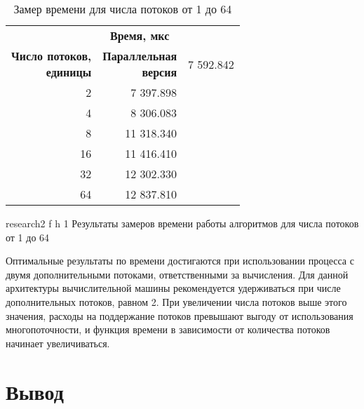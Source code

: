 \begin{table}[ht]
	\small
	\begin{center}
		\begin{threeparttable}
			\caption{Замер времени для числа потоков от 1 до 64}
			\label{tbl:time2}
			\begin{tabular}{|r|r|r|}
				\hline
				& \multicolumn{1}{c|}{\bfseries Время, мкс} \\ \cline{2-2}
				\bfseries \makecell{Число потоков, \\ единицы} & \bfseries \makecell{Параллельная \\ версия} \cline{2-2}
				\hline
				1 & 7 592.842 \\
				\hline
				2 & 7 397.898 \\
				\hline
				4 & 8 306.083  \\
				\hline
				8 & 11 318.340 \\
				\hline
				16 & 11 416.410 \\
				\hline
				32 & 12 302.330 \\
				\hline
				64 & 12 837.810 \\
				\hline
			\end{tabular}	
		\end{threeparttable}
	\end{center}
\end{table}

\clearpage

{research2} %
{f} %
{h} %
{1\textwidth} %
{Результаты замеров времени работы алгоритмов для числа потоков от 1 до 64} %

Оптимальные результаты по времени достигаются при использовании процесса с двумя дополнительными потоками, ответственными за вычисления. Для данной архитектуры вычислительной машины рекомендуется удерживаться при числе дополнительных потоков, равном 2. При увеличении числа потоков выше этого значения, расходы на поддержание потоков превышают выгоду от использования многопоточности, и функция времени в зависимости от количества потоков начинает увеличиваться.

\clearpage

\section*{Вывод}

